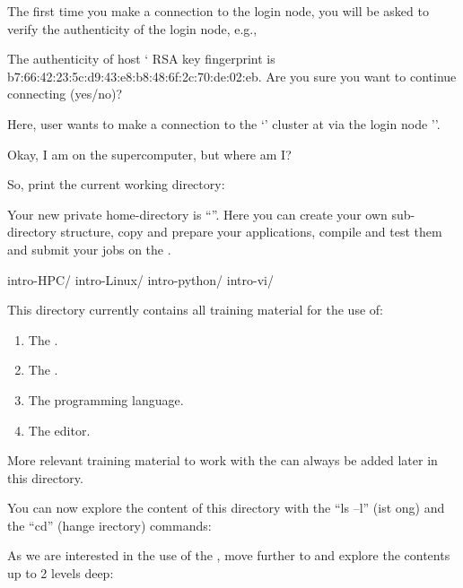 The first time you make a connection to the login node, you will be asked to
verify the authenticity of the login node, e.g.,

\begin{prompt}
The authenticity of host `%
RSA key fingerprint is b7:66:42:23:5c:d9:43:e8:b8:48:6f:2c:70:de:02:eb.
Are you sure you want to continue connecting (yes/no)? %
\end{prompt}

Here, user \userid wants to make a connection to the `\hpcname' cluster at
\university via the login node '\loginnode'.

Okay, I am on the supercomputer, but where am I?

So, print the current working directory:
\begin{prompt}
\end{prompt}

Your new private home-directory is ``\homedir''.
Here you can create your own sub-directory structure, copy and prepare your
applications, compile and test them and submit your jobs on the \hpc.

\begin{prompt}
intro-HPC/
intro-Linux/
intro-python/
intro-vi/
\end{prompt}

This directory currently contains all training material for the use of:

\begin{enumerate}
\item  The .
\item  The .
\item  The  programming language.
\item  The  editor.
\end{enumerate}

More relevant training material to work with the \hpc can always be added
later in this directory.

You can now explore the content of this directory with the ``ls --l''
(ist ong) and the ``cd'' (hange
irectory) commands:

As we are interested in the use of the , move further to
 and explore the contents up to 2 levels deep:

